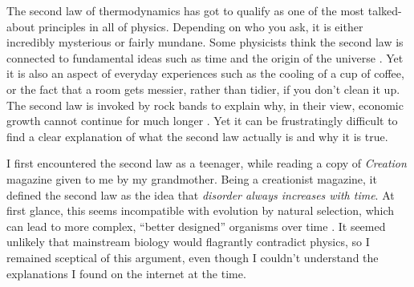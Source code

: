 \documentclass[a4paper, 12pt]{article}
\title{}
\author{Brendon J. Brewer}
\begin{document}
\sffamily
\maketitle

The second law of thermodynamics has got to qualify as one of the most
talked-about principles in all of physics. Depending on who you ask, it is
either incredibly mysterious or fairly mundane. Some physicists think
the second law is connected to
fundamental ideas such as time and the origin of the universe
\citep{carroll}. Yet it is also an aspect of everyday experiences
such as the cooling of a
cup of coffee, or the fact that a room gets messier, rather than tidier,
if you don't clean it up. The second law is invoked by rock bands to explain
why, in their
view, economic growth cannot continue for much longer \citep{muse}.
Yet it can be frustratingly difficult to find a
clear explanation of what the second law actually is and why it is true.

I first encountered the second law
as a teenager, while reading a copy of {\em Creation} magazine given to me
by my grandmother. Being a creationist magazine, it defined the second law as
the idea that {\em disorder always increases with time}.
At first glance, this seems incompatible with evolution by
natural selection, which can lead to more complex,
``better designed'' organisms over time \citep{dawkins}.
It seemed unlikely that mainstream biology would flagrantly
contradict physics, so I remained sceptical of this argument,
even though I couldn't understand the explanations I found on the
internet at the time.
\end{document}
